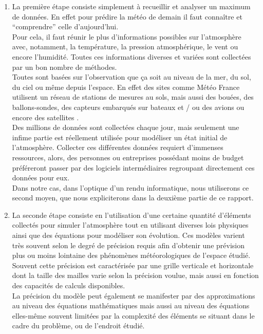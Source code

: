 \documentclass[12pt]{report}
\begin{document}
        \begin{enumerate}
            \item La première étape consiste simplement à recueillir et analyser un maximum de données. En effet pour prédire la météo de demain il faut connaître et “comprendre” celle d’aujourd’hui. \\
            Pour cela, il faut réunir le plus d’informations possibles sur l'atmosphère avec, notamment, la température, la pression atmosphérique, le vent ou encore l’humidité. Toutes ces informations diverses et variées sont collectées par un bon nombre de méthodes.\\ 
            Toutes sont basées sur l’observation que ça soit au niveau de la mer, du sol, du ciel ou même depuis l’espace. En effet des sites comme Météo France utilisent un réseau de stations de mesures au sols, mais aussi des bouées, des ballons-sondes, des capteurs embarqués sur bateaux et / ou des avions ou encore des satellites \cite{moyens d'obs MétéoFR}.\\ 
            Des millions de données sont collectées chaque jour, mais seulement une infime partie est réellement utilisée pour modéliser un état initial de l'atmosphère. Collecter ces différentes données requiert d'immenses ressources, alors, des personnes ou entreprises possédant moins de budget préféreront passer par des logiciels intermédiaires regroupant directement ces données pour eux.\\ 
            Dans notre cas,  dans l’optique d’un rendu informatique, nous utiliserons ce second moyen, que nous expliciterons dans la deuxième partie de ce rapport.\\
            
            \item La seconde étape consiste en l’utilisation d’une certaine quantité d’éléments collectés pour simuler l'atmosphère tout en utilisant diverses lois physiques ainsi que des équations pour modéliser son évolution. Ces modèles varient très souvent selon le degré de précision requis afin d’obtenir une prévision plus ou moins lointaine des phénomènes météorologiques de l'espace étudié.
            Souvent cette précision est caractérisée par une grille verticale et horizontale dont la taille des mailles varie selon la précision voulue, mais aussi en fonction des capacités de calculs disponibles.\\
            \clearpage
            La précision du modèle peut également se manifester par des approximations au niveau des équations mathématiques mais aussi au niveau des équations elles-même souvent limitées par la complexité des éléments se situant dans le cadre du problème, ou de l’endroit étudié.\\
            

\end{enumerate}
\end{document}
